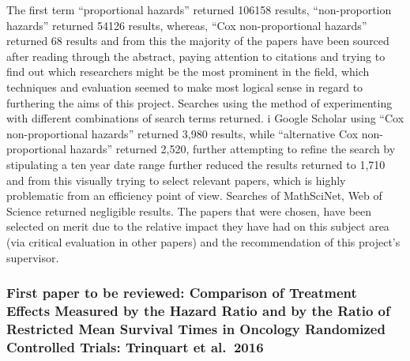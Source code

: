 \documentclass[12pt,twoside]{reedthesis}
\begin{document}
The first term ``proportional hazards'' returned 106158 results, ``non-proportion hazards'' returned 54126 results, whereas, ``Cox non-proportional hazards'' returned 68 results and from this the majority of the papers have been sourced after reading through the abstract, paying attention to citations and trying to find out which researchers might be the most prominent in the field, which techniques and evaluation seemed to make most logical sense in regard to furthering the aims of this project. Searches using the method of experimenting with different combinations of search terms returned. i Google Scholar using ``Cox non-proportional hazards'' returned 3,980 results, while ``alternative Cox non-proportional hazards'' returned 2,520, further attempting to refine the search by stipulating a ten year date range further reduced the results returned to 1,710 and from this visually trying to select relevant papers, which is highly problematic from an efficiency point of view. Searches of MathSciNet, Web of Science returned negligible results. The papers that were chosen, have been selected on merit due to the relative impact they have had on this subject area (via critical evaluation in other papers) and the recommendation of this project's supervisor.

\hypertarget{first-paper-to-be-reviewed-comparison-of-treatment-effects-measured-by-the-hazard-ratio-and-by-the-ratio-of-restricted-mean-survival-times-in-oncology-randomized-controlled-trials-trinquart-et-al.-2016}{%
\subsubsection{First paper to be reviewed: Comparison of Treatment Effects Measured by the Hazard Ratio and by the Ratio of Restricted Mean Survival Times in Oncology Randomized Controlled Trials: Trinquart et al.~2016}\label{first-paper-to-be-reviewed-comparison-of-treatment-effects-measured-by-the-hazard-ratio-and-by-the-ratio-of-restricted-mean-survival-times-in-oncology-randomized-controlled-trials-trinquart-et-al.-2016}}
\end{document}
